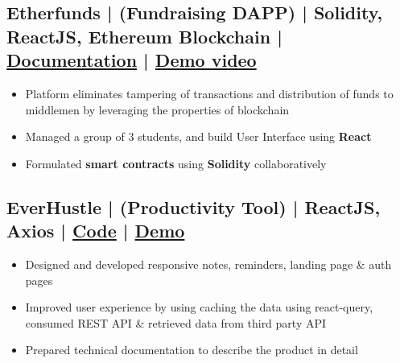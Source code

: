 \documentclass[a4,10pt]{article}
\newenvironment{zitemize}{
\begin{itemize}\itemsep0pt \parskip0pt \parsep1pt}
{\end{itemize}\vspace{-0.5cm}}
\begin{document}

\subsection*{Etherfunds {\normalsize\normalfont | (Fundraising DAPP) | Solidity, ReactJS, Ethereum Blockchain } |  {\href{https://developersleague.github.io/Etherfunds/}{Documentation} } | {\href{https://youtu.be/UXFDYHBjoxo}{Demo video} }
} 
    \begin{zitemize}
        \item Platform eliminates tampering of transactions and distribution of funds to middlemen by leveraging the properties of blockchain
        \item Managed a group of 3 students, and build User Interface using \textbf{React}
        \item Formulated \textbf{smart contracts} using \textbf{Solidity} collaboratively
    \end{zitemize}


\subsection*{EverHustle {\normalsize\normalfont | (Productivity Tool) | ReactJS, Axios} |  {\href{https://github.com/DevelopersLeague/EverHustle-FrontEnd}{Code} }| {\href{https://everhustle.netlify.app/}{Demo} }} 
    \begin{zitemize}
        
        \item Designed and developed responsive notes, reminders, landing page \& auth pages
        \item Improved user experience by using caching the data using react-query, consumed REST API \& retrieved data
        from third party API
        \item Prepared technical documentation to describe the product in detail
    \end{zitemize}

\vspace{0.1cm}
\end{document}
